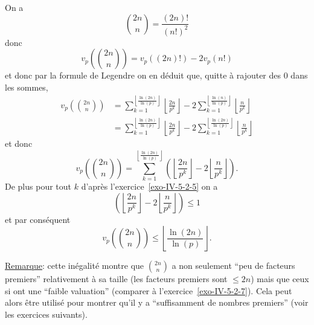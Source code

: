 \begin{sol}
    On a
    \[\binom{2n}{n} = \frac{(2n)!}{(n!)^2}\]
    donc
    \[v_p\left(\binom{2n}{n}\right) = v_p \left( (2n)!\right)-2 v_p(n!)\]
    et donc par la formule de Legendre on en déduit que, quitte à rajouter des $0$ dans les sommes,
    \[\begin{aligned}
        v_p\left( \binom{2n}{n}\right) &= \sum_{k=1}^{\left\lfloor \frac{\ln(2n)}{\ln(p)} \right\rfloor} \left\lfloor \frac{2n}{p^k} \right\rfloor - 2 \sum_{k=1}^{\left\lfloor \frac{\ln(n)}{\ln(p)} \right\rfloor}\left\lfloor \frac{n}{p^k} \right\rfloor  \\
        &= \sum_{k=1}^{\left\lfloor \frac{\ln(2n)}{\ln(p)} \right\rfloor} \left\lfloor \frac{2n}{p^k} \right\rfloor - 2 \sum_{k=1}^{\left\lfloor \frac{\ln(2n)}{\ln(p)} \right\rfloor}\left\lfloor \frac{n}{p^k} \right\rfloor  
    \end{aligned}\]
    et donc
    \[\boxed{v_p\left( \binom{2n}{n}\right) = \sum_{k=1}^{\left\lfloor \frac{\ln(2n)}{\ln(p)} \right\rfloor} \left(\left\lfloor \frac{2n}{p^k} \right\rfloor - 2 \left\lfloor \frac{n}{p^k} \right\rfloor  \right)}.\]
    De plus pour tout $k$ d'après l'exercice~\ref{exo-IV-5-2-5} on a
    \[\left(\left\lfloor \frac{2n}{p^k} \right\rfloor - 2 \left\lfloor \frac{n}{p^k} \right\rfloor  \right) \leq 1\]
    et par conséquent
    \[\boxed{v_p\left( \binom{2n}{n}\right) \leq \left\lfloor \frac{\ln(2n)}{\ln(p)} \right\rfloor}.\]
    
    \underline{Remarque}: cette inégalité montre que $\binom{2n}{n}$ a non seulement ``peu de facteurs premiers'' relativement à sa taille (les facteurs premiers sont $\leq 2n$) mais que ceux si ont une ``faible valuation'' (comparer à l'exercice~\ref{exo-IV-5-2-7}). Cela peut alors être utilisé pour montrer qu'il y a ``suffisamment de nombres premiers'' (voir les exercices suivants).
\end{sol}
    


